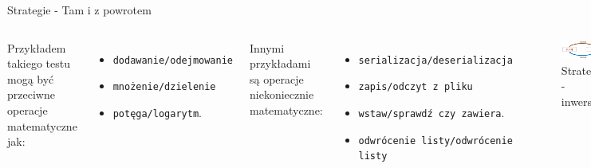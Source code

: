 \begin{frame}{Strategie - Tam i z powrotem}
    \begin{columns}[t]
            Przykładem takiego testu mogą być przeciwne operacje matematyczne jak:
            \begin{itemize}
                \item \texttt{dodawanie/odejmowanie}
                \item \texttt{mnożenie/dzielenie}
                \item \texttt{potęga/logarytm}.
            \end{itemize} 
            Innymi przykładami są operacje niekoniecznie matematyczne:
            \begin{itemize}
                \item \texttt{serializacja/deserializacja}
                \item \texttt{zapis/odczyt z pliku}
                \item \texttt{wstaw/sprawdź czy zawiera}.
                \item \texttt{odwrócenie listy/odwrócenie listy}
            \end{itemize} 
        \centering
        \begin{figure}
            \centering
            \includegraphics[width=1\textwidth]{images/property_list_rev_inverse.png}
            \caption{Strategia - inwersja}
            \label{fig:inverse_strategy_example}
        \end{figure}    
    \end{columns}
\end{frame}

